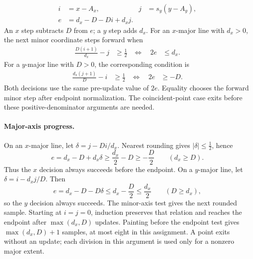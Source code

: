 \begin{align*}
i &= x-A_x, & j &= s_y(y-A_y),\\
e &= d_x-D-Di+d_xj.
\end{align*}
An $x$ step subtracts $D$ from $e$; a $y$ step adds $d_x$.
For an $x$-major line with $d_x>0$, the next minor coordinate steps forward when
\begin{align*}
\frac{D(i+1)}{d_x}-j &\ge \frac12
&\Longleftrightarrow\quad 2e &\le d_x.
\end{align*}
For a $y$-major line with $D>0$, the corresponding condition is
\begin{align*}
\frac{d_x(j+1)}{D}-i &\ge \frac12
&\Longleftrightarrow\quad 2e &\ge -D.
\end{align*}
Both decisions use the same pre-update value of $2e$. Equality chooses the forward
minor step after endpoint normalization. The coincident-point case exits before
these positive-denominator arguments are needed.


\paragraph{Major-axis progress.}
On an $x$-major line, let $\delta=j-Di/d_x$. Nearest rounding gives
$|\delta|\le\tfrac12$, hence
\[
 e=d_x-D+d_x\delta\ge\frac{d_x}{2}-D\ge-\frac D2
 \qquad(d_x\ge D).
\]
Thus the $x$ decision always succeeds before the endpoint.
On a $y$-major line, let $\delta=i-d_xj/D$. Then
\[
 e=d_x-D-D\delta\le d_x-\frac D2\le\frac{d_x}{2}
 \qquad(D\ge d_x),
\]
so the $y$ decision always succeeds. The minor-axis test gives the next rounded
sample. Starting at $i=j=0$, induction preserves that relation and reaches the
endpoint after $\max(d_x,D)$ updates. Painting before the endpoint test gives
$\max(d_x,D)+1$ samples, at most eight in this assignment. A point exits without
an update; each division in this argument is used only for a nonzero major extent.
